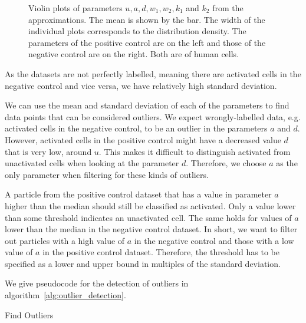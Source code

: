 \begin{figure}[h!]
	\caption{Violin plots of parameters $u, a, d, w_1, w_2, k_1$ and $k_2$ from the approximations. The mean is shown by the bar. The width of the individual plots corresponds to the distribution density. The parameters of the positive control are on the left and those of the negative control are on the right. Both are of human cells.}
	\label{fig:parameter_violin_plot}
\end{figure}

As the datasets are not perfectly labelled, meaning there are activated cells in the negative control and vice versa, we have relatively high standard deviation.

We can use the mean and standard deviation of each of the parameters to find data points that can be considered outliers. We expect wrongly-labelled data, e.g. activated cells in the negative control, to be an outlier in the parameters $a$ and $d$. However, activated cells in the positive control might have a decreased value $d$ that is very low, around $u$. This makes it difficult to distinguish activated from unactivated cells when looking at the parameter $d$. Therefore, we choose $a$ as the only parameter when filtering for these kinds of outliers.

A particle from the positive control dataset that has a value in parameter $a$ higher than the median should still be classified as activated. Only a value lower than some threshold indicates an unactivated cell. The same holds for values of $a$ lower than the median in the negative control dataset. In short, we want to filter out particles with a high value of $a$ in the negative control and those with a low value of $a$ in the positive control dataset. Therefore, the threshold has to be specified as a lower and upper bound in multiples of the standard deviation.

We give pseudocode for the detection of outliers in algorithm~\ref{alg:outlier_detection}.
\newpage

\begin{algorithm}[H] \label{alg:outlier_detection}
	\SetAlgoLined
	\DontPrintSemicolon
	\LinesNumbered
	\caption{Find Outliers}
	
	
	\BlankLine
\end{algorithm}
\vspace{1cm}

